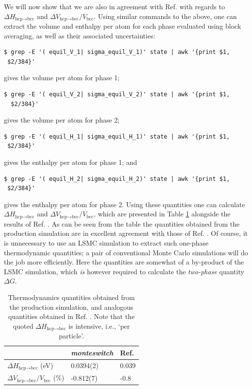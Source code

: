 \documentclass{report}
\begin{document}
We will now show that we are also in agreement with Ref. \cite{Mendelev_2007} with regards to $\Delta H_{\text{hcp$\to$bcc}}$ and 
$\Delta V_{\text{hcp$\to$bcc}}/V_{\text{bcc}}$. Using similar commands to the above, one can extract the volume and enthalpy per atom for each phase
evaluated using block averaging, as well as their associated uncertainties:
\begin{verbatim}
$ grep -E '( equil_V_1| sigma_equil_V_1)' state | awk '{print $1,
 $2/384}'
\end{verbatim}
gives the volume per atom for phase 1;
\begin{verbatim}
$ grep -E '( equil_V_2| sigma_equil_V_2)' state | awk '{print $1,
  $2/384}'
\end{verbatim}
gives the volume per atom for phase 2;
\begin{verbatim}
$ grep -E '( equil_H_1| sigma_equil_H_1)' state | awk '{print $1,
 $2/384}'
\end{verbatim}
gives the enthalpy per atom for phase 1; and
\begin{verbatim}
$ grep -E '( equil_H_2| sigma_equil_H_2)' state | awk '{print $1,
 $2/384}'
\end{verbatim}
gives the enthalpy per atom for phase 2. Using these quantities one can calculate $\Delta H_{\text{hcp$\to$bcc}}$ and $\Delta V_{\text{hcp$\to$bcc}}/V_{\text{bcc}}$,
which are presented in Table \ref{table:production_results} alongside the results of Ref. \cite{Mendelev_2007}. As can be seen from the table
the quantities obtained from the production simulation are in excellent agreement with those of Ref. \cite{Mendelev_2007}. Of course, it is unnecessary 
to use an LSMC simulation to extract such one-phase thermodynamic quantities; a pair of conventional Monte Carlo simulations will do the job more 
efficiently. Here the quantities are somewhat of a by-product of the LSMC simulation, which \emph{is} however required to calculate the \emph{two-phase}
quantity $\Delta G$.

\begin{table}\label{table:production_results}
\begin{center}
\begin{tabular}{l | l | l }
                                          &  \emph{monteswitch}      & Ref. \cite{Mendelev_2007} \\
                                                        \hline
$\Delta H_{\text{hcp$\to$bcc}}$ (eV)                 & 0.0394(2)                & 0.039                     \\
$\Delta V_{\text{hcp$\to$bcc}}/V_{\text{bcc}}$ (\%)          & -0.812(7)                & -0.8                      \\
\end{tabular}
\caption{Thermodynamics quantities obtained from the production simulation, and analogous quantities obtained in Ref.  \cite{Mendelev_2007}. Note that
the quoted $\Delta H_{\text{hcp$\to$bcc}}$ is intensive, i.e., `per particle'.}
\end{center}
\end{table}
\end{document}
